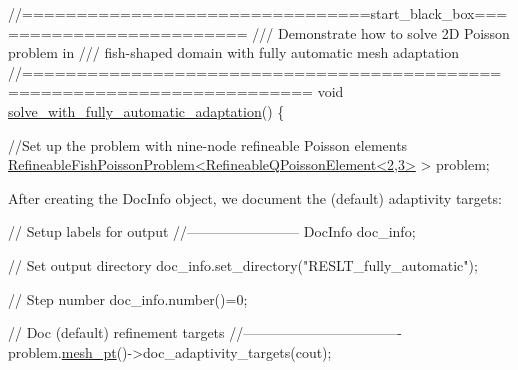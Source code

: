  
\begin{DoxyCodeInclude}
\textcolor{comment}{//================================start\_black\_box=========================}
\textcolor{comment}{/// Demonstrate how to solve 2D Poisson problem in }
\textcolor{comment}{}\textcolor{comment}{/// fish-shaped domain with fully automatic mesh adaptation}
\textcolor{comment}{}\textcolor{comment}{//========================================================================}
\textcolor{keywordtype}{void} \hyperlink{fish__poisson_8cc_a79a1cfcdcd821bd277276d163b85acfb}{solve\_with\_fully\_automatic\_adaptation}()
\{

  \textcolor{comment}{//Set up the problem with nine-node refineable Poisson elements}
  \hyperlink{classRefineableFishPoissonProblem}{RefineableFishPoissonProblem<RefineableQPoissonElement<2,3>}
       > problem;

\end{DoxyCodeInclude}


After creating the {\ttfamily Doc\+Info} object, we document the (default) adaptivity targets\+:


\begin{DoxyCodeInclude}
  \textcolor{comment}{// Setup labels for output}
  \textcolor{comment}{//------------------------}
  DocInfo doc\_info;
  
  \textcolor{comment}{// Set output directory}
  doc\_info.set\_directory(\textcolor{stringliteral}{"RESLT\_fully\_automatic"}); 
  
  \textcolor{comment}{// Step number}
  doc\_info.number()=0;


  \textcolor{comment}{// Doc (default) refinement targets}
  \textcolor{comment}{//----------------------------------}
  problem.\hyperlink{classRefineableFishPoissonProblem_a803c9050b07b35aba22f08a5a9e59f2c}{mesh\_pt}()->doc\_adaptivity\_targets(cout);

\end{DoxyCodeInclude}


